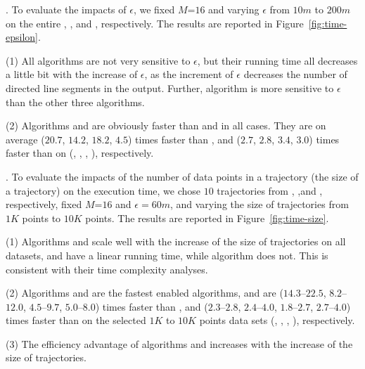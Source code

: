 .
To evaluate the impacts of $\epsilon$, we fixed \textcolor[rgb]{0.00,0.07,1.00}{$M$=$16$} and varying $\epsilon$  from $10m$ to $200m$ on the entire \truck, \sercar, \geolife and \pricar, respectively.
The results are reported in Figure~\ref{fig:time-epsilon}.

\ni(1) All algorithms are not very sensitive to $\epsilon$, but their running time all decreases a little bit with the increase of $\epsilon$, as the increment of $\epsilon$ decreases the number of directed line segments in the output.
Further, algorithm \dps is more sensitive to $\epsilon$ than the other three algorithms.

\ni\textcolor[rgb]{0.00,0.07,1.00}{{(2)}} Algorithms \cist and \cista are obviously faster than \dps and \squishe in all cases.
They are on average ($20.7$, $14.2$, $18.2$, \textcolor[rgb]{1.00,0.50,0.25}{{$4.5$}}) times faster than \dps, and ($2.7$, $2.8$, $3.4$, {$3.0$}) times faster than \squishe on (\truck, \sercar, {\geolife}, \pricar), respectively.


.
To evaluate the impacts of the number of data points in a trajectory (\ie the size of a trajectory) on the execution time,
we chose {$10$} trajectories from \truck, \sercar,\geolife and \pricar, respectively,
fixed \textcolor[rgb]{0.00,0.07,1.00}{$M$=$16$} and $\epsilon = 60m$, and varying the size  of trajectories from $1K$ points to $10K$ points.
%
The results are reported in Figure~\ref{fig:time-size}.

\ni(1) Algorithms \cist and \cista scale well with the increase of the size of trajectories on all datasets,
and have a linear running time, while algorithm \dps does not.
This is consistent with their time complexity analyses.

\ni\textcolor[rgb]{1.00,0.00,0.00}{(2)} Algorithms \cist and \cista are the fastest \sed enabled \lsa algorithms, and are {($14.3$--$22.5$, $8.2$--$12.0$, $4.5$--$9.7$, $5.0$--$8.0$)} times faster than \dps,
and {($2.3$--$2.8$, $2.4$--$4.0$, $1.8$--$2.7$, $2.7$--$4.0$)} times faster than \squishe on the selected $1K$ to $10K$ points data sets (\truck, \sercar, \geolife, \pricar), respectively.

\ni(3) The efficiency advantage of algorithms \cist and \cista increases with the increase of the size of trajectories.



